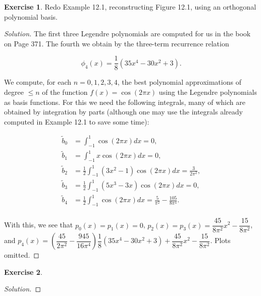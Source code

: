 \documentclass[12pt,a4]{article}
\theoremstyle{definition}
\newtheorem{exercise}{Exercise}
\begin{document}
\begin{exercise}
	Redo Example 12.1, reconstructing Figure 12.1, using an orthogonal polynomial basis.
\end{exercise}
\begin{proof}[Solution]
	The first three Legendre polynomials are computed for us in the book on Page 371. The fourth we obtain by the three-term recurrence relation
	
	\[
	\phi_4(x) = \frac{1}{8} (35 x^4 - 30 x^2 + 3) {.}
	\]

	\noindent We compute, for each $n = 0, 1, 2, 3, 4$, the best polynomial approximations of degree $\leq n$ of the function $f(x) = \cos(2 \pi x)$ using the Legendre polynomials as basis functions. For this we need the following integrals, many of which are obtained by integration by parts (although one may use the integrals already computed in Example 12.1 to save some time):
	
	\begin{align*}
	\tilde{b}_0 &= \int_{-1}^1 \cos(2 \pi x) dx = 0 {,} \\
	\tilde{b}_1 &= \int_{-1}^1 x \cos(2 \pi x) dx = 0 {,} \\
	\tilde{b}_2 &= \frac{1}{2} \int_{-1}^1 (3 x^2 - 1) \cos(2 \pi x) dx = \frac{3}{2 \pi^2} {,} \\
	\tilde{b}_3 &= \frac{1}{2} \int_{-1}^1 (5 x^3 - 3 x) \cos(2 \pi x) dx = 0 {,} \\
	\tilde{b}_4 &= \frac{1}{2} \int_{-1}^1 \cos(2 \pi x) dx = \frac{5}{\pi^2} - \frac{105}{8 \pi^4} {.} \\
	\end{align*}
	
	\noindent With this, we see that $p_0(x) = p_1(x) = 0$, $p_2(x) = p_3(x) = \dfrac{45}{8 \pi^2} x^2 - \dfrac{15}{8 \pi^2}$, and $p_4(x) = \left( \dfrac{45}{2 \pi^2} - \dfrac{945}{16 \pi^4} \right) \dfrac{1}{8} \left( 35 x^4 - 30 x^2 + 3 \right) + \dfrac{45}{8 \pi^2} x^2 - \dfrac{15}{8 \pi^2}$. Plots omitted.
\end{proof}

\begin{exercise}
	
\end{exercise}
\begin{proof}[Solution]
	
\end{proof}
\end{document}
